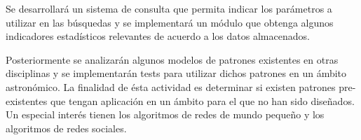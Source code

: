 	Se desarrollará un sistema de consulta que permita indicar los parámetros a utilizar en las búsquedas y se implementará un módulo que obtenga algunos indicadores estadísticos relevantes de acuerdo a los datos almacenados.
	
	Posteriormente se analizarán algunos modelos de patrones existentes en otras disciplinas y se implementarán tests para utilizar dichos patrones en un ámbito astronómico. La finalidad de ésta actividad es determinar si existen patrones pre-existentes que tengan aplicación en un ámbito para el que no han sido diseñados. Un especial interés tienen los algoritmos de redes de mundo pequeño\cite{kleinberg2000navigation} y los algoritmos de redes sociales\cite{carrington2005models}.

\fi